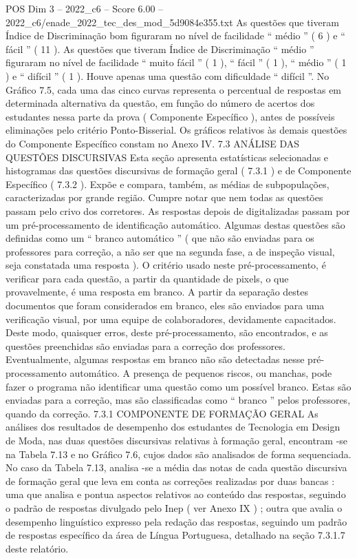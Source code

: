 \begin{textsample}{POS Dim 3 – 2022\_c6 – Score 6.00 – 2022\_c6/enade\_2022\_tec\_des\_mod\_5d9084e355.txt}
As questões que tiveram Índice de Discriminação bom figuraram no nível de facilidade “ médio ” ( 6 ) e “ fácil ” ( 11 ).
As questões que tiveram Índice de Discriminação “ médio ” figuraram no nível de facilidade “ muito fácil ” ( 1 ), “ fácil ” ( 1 ), “ médio ” ( 1 ) e “ difícil ” ( 1 ).
Houve apenas uma questão com dificuldade “ difícil ”.
No Gráfico 7.5, cada uma das cinco curvas representa o percentual de respostas em determinada alternativa da questão, em função do número de acertos dos estudantes nessa parte da prova ( Componente Específico ), antes de possíveis eliminações pelo critério Ponto-Bisserial.
Os gráficos relativos às demais questões do Componente Específico constam no Anexo IV. 7.3 ANÁLISE DAS QUESTÕES DISCURSIVAS Esta seção apresenta estatísticas selecionadas e histogramas das questões discursivas de formação geral ( 7.3.1 ) e de Componente Específico ( 7.3.2 ).
Expõe e compara, também, as médias de subpopulações, caracterizadas por grande região.
Cumpre notar que nem todas as questões passam pelo crivo dos corretores.
As respostas depois de digitalizadas passam por um pré-processamento de identificação automático.
Algumas destas questões são definidas como um “ branco automático ” ( que não são enviadas para os professores para correção, a não ser que na segunda fase, a de inspeção visual, seja constatada uma resposta ).
O critério usado neste pré-processamento, é verificar para cada questão, a partir da quantidade de pixels, o que provavelmente, é uma resposta em branco.
A partir da separação destes documentos que foram considerados em branco, eles são enviados para uma verificação visual, por uma equipe de colaboradores, devidamente capacitados.
Deste modo, quaisquer erros, deste pré-processamento, são encontrados, e as questões preenchidas são enviadas para a correção dos professores.
Eventualmente, algumas respostas em branco não são detectadas nesse pré-processamento automático.
A presença de pequenos riscos, ou manchas, pode fazer o programa não identificar uma questão como um possível branco.
Estas são enviadas para a correção, mas são classificadas como “ branco ” pelos professores, quando da correção. 7.3.1 COMPONENTE DE FORMAÇÃO GERAL As análises dos resultados de desempenho dos estudantes de Tecnologia em Design de Moda, nas duas questões discursivas relativas à formação geral, encontram -se na Tabela 7.13 e no Gráfico 7.6, cujos dados são analisados de forma sequenciada.
No caso da Tabela 7.13, analisa -se a média das notas de cada questão discursiva de formação geral que leva em conta as correções realizadas por duas bancas : uma que analisa e pontua aspectos relativos ao conteúdo das respostas, seguindo o padrão de respostas divulgado pelo Inep ( ver Anexo IX ) ; outra que avalia o desempenho linguístico expresso pela redação das respostas, seguindo um padrão de respostas específico da área de Língua Portuguesa, detalhado na seção 7.3.1.7 deste relatório.

\end{textsample}
